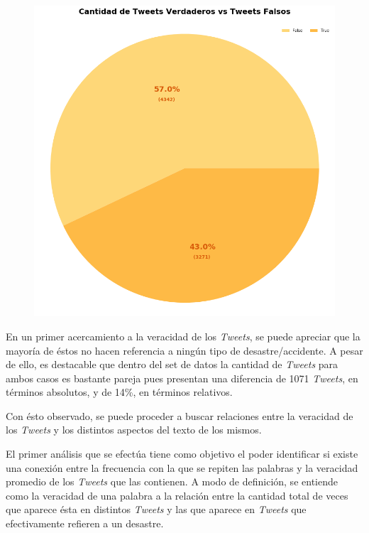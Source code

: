 \documentclass[titlepage,a4paper]{article}
\begin{document}
    \begin{figure}[H]
    \centering
    \includegraphics[width=1\textwidth]{graficos/Analisis Lexico Grafico/cantidad_de_tweets_verdadeos_vs_falsos.png}
    \end{figure}
    
    En un primer acercamiento a la veracidad de los \textit{Tweets}, se puede apreciar que la mayoría de éstos no hacen referencia a ningún tipo de desastre/accidente. A pesar de ello, es destacable que dentro del set de datos la cantidad de \textit{Tweets} para ambos casos es bastante pareja pues presentan una diferencia de 1071 \textit{Tweets}, en términos absolutos, y de 14\%, en términos relativos.
    
    Con ésto observado, se puede proceder a buscar relaciones entre la veracidad de los \textit{Tweets} y los distintos aspectos del texto de los mismos.
    
    El primer análisis que se efectúa tiene como objetivo el poder identificar si existe una conexión entre la frecuencia con la que se repiten las palabras y la veracidad promedio de los \textit{Tweets}  que las contienen. A modo de definición, se entiende como la veracidad de una palabra a la relación entre la cantidad total de veces que aparece ésta en distintos \textit{Tweets} y las que aparece en \textit{Tweets} que efectivamente refieren a un desastre.
    
\end{document}
